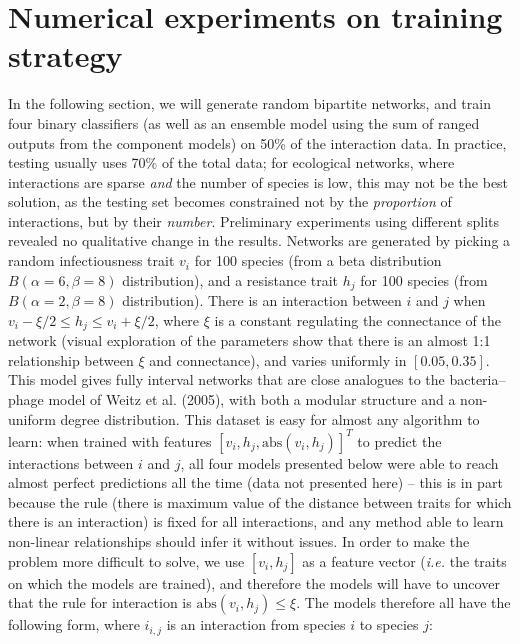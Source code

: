 \documentclass[10pt,oneside]{article}
\begin{document}
\hypertarget{numerical-experiments-on-training-strategy}{%
\section{Numerical experiments on training
strategy}\label{numerical-experiments-on-training-strategy}}

In the following section, we will generate random bipartite networks,
and train four binary classifiers (as well as an ensemble model using
the sum of ranged outputs from the component models) on 50\% of the
interaction data. In practice, testing usually uses 70\% of the total
data; for ecological networks, where interactions are sparse \emph{and}
the number of species is low, this may not be the best solution, as the
testing set becomes constrained not by the \emph{proportion} of
interactions, but by their \emph{number}. Preliminary experiments using
different splits revealed no qualitative change in the results. Networks
are generated by picking a random infectiousness trait \(v_i\) for 100
species (from a beta distribution \(B(\alpha=6,\beta=8)\) distribution),
and a resistance trait \(h_j\) for 100 species (from
\(B(\alpha=2,\beta=8)\) distribution). There is an interaction between
\(i\) and \(j\) when \(v_i-\xi/2 \le h_j \le v_i+\xi/2\), where \(\xi\)
is a constant regulating the connectance of the network (visual
exploration of the parameters show that there is an almost 1:1
relationship between \(\xi\) and connectance), and varies uniformly in
\([0.05, 0.35]\). This model gives fully interval networks that are
close analogues to the bacteria--phage model of Weitz et al. (2005),
with both a modular structure and a non-uniform degree distribution.
This dataset is easy for almost any algorithm to learn: when trained
with features \([v_i, h_j, \text{abs}(v_i, h_j)] ^T\) to predict the
interactions between \(i\) and \(j\), all four models presented below
were able to reach almost perfect predictions all the time (data not
presented here) -- this is in part because the rule (there is maximum
value of the distance between traits for which there is an interaction)
is fixed for all interactions, and any method able to learn non-linear
relationships should infer it without issues. In order to make the
problem more difficult to solve, we use \([v_i, h_j]\) as a feature
vector (\emph{i.e.} the traits on which the models are trained), and
therefore the models will have to uncover that the rule for interaction
is \(\text{abs}(v_i, h_j) \le \xi\). The models therefore all have the
following form, where \(i_{i,j}\) is an interaction from species \(i\)
to species \(j\):
\end{document}
